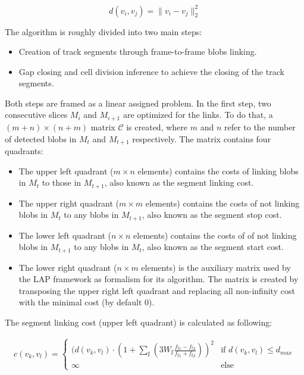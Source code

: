 \documentclass[pdftex,12pt,a4paper]{report}
\begin{document}
\begin{equation}
d(v_i, v_j) = \| v_i - v_j\|^2_2
\label{eq:particle_cost_function}
\end{equation}

The algorithm is roughly divided into two main steps:

\begin{itemize}
\item  Creation of track segments through frame-to-frame blobs linking.
\item  Gap closing and cell division inference to achieve the closing of the track segments.
\end{itemize}

Both steps are framed as a linear assigned problem. In the first step, two consecutive slices $M_i$  and $M_{i+1}$ are optimized for the links. To do that, a $(m + n) \times (n + m)$ matrix $\mathcal{C}$ is created, where $m$ and $n$ refer to the number of detected blobs in $M_t$ and $M_{t + 1}$ respectively. The matrix contains four quadrants:

\begin{itemize}
\item The upper left quadrant ($m \times n$ elements) contains the costs of linking blobs in $M_t$ to those in $M_{t + 1}$, also known as the segment linking cost.
\item The upper right quadrant ($m \times m$ elements) contains the costs of not linking blobs in $M_t$ to any blobs in $M_{t + 1}$, also known as the segment stop cost.
\item The lower left quadrant ($n \times n$ elements) contains the costs of of not linking blobs in $M_{t + 1}$ to any blobs in $M_t$, also known as the segment start cost.
\item The lower right quadrant ($n \times m$ elements) is the auxiliary matrix used by the LAP framework as formalism for its algorithm. The matrix is created by transposing the upper right left quadrant and replacing all non-infinity cost with the minimal cost (by default 0).
\end{itemize}

The segment linking cost (upper left quadrant) is calculated as following:

\begin{gather*}
c(v_k, v_l) =
\begin{cases}
  (d(v_k, v_l) \cdot \left(1 + \sum_{\mathbb{f}} \left(3 W_{\mathbb{f}} \frac{ f_{\mathbb{f}1} - f_{\mathbb{f}2} }{f_{\mathbb{f}1} + f_{\mathbb{f}2}} \right)\right)^2 & \text{if } d(v_k, v_l) \leq d_{max} \\    
  \infty & \text{else}  
\end{cases}
\end{gather*}
\end{document}
